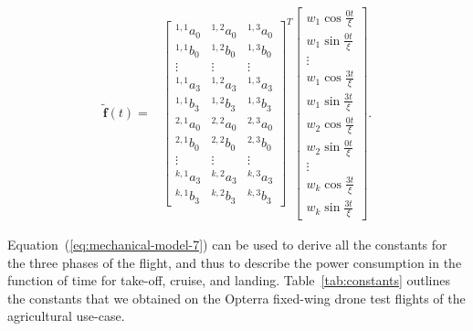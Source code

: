 \begin{equation}\label{eq:mechanical-model-7}
  \begin{split}
  \widetilde{\mathbf{f}}(t)=&
  \begin{bmatrix}
    {}^{1,1}a_0 & {}^{1,2}a_0 & {}^{1,3}a_0 \\
    {}^{1,1}b_0 & {}^{1,2}b_0 & {}^{1,3}b_0 \\
    \vdots & \vdots &\vdots \\
    {}^{1,1}a_3 & {}^{1,2}a_3 & {}^{1,3}a_3 \\
    {}^{1,1}b_3 & {}^{1,2}b_3 & {}^{1,3}b_3 \\
    {}^{2,1}a_0 & {}^{2,2}a_0 & {}^{2,3}a_0 \\
    {}^{2,1}b_0 & {}^{2,2}b_0 & {}^{2,3}b_0 \\
    \vdots & \vdots &\vdots \\
    {}^{k,1}a_3 & {}^{k,2}a_3 & {}^{k,3}a_3 \\
    {}^{k,1}b_3 & {}^{k,2}b_3 & {}^{k,3}b_3
  \end{bmatrix}^T
  \begin{bmatrix}
    w_1\cos\frac{0t}{\xi} \\ w_1\sin\frac{0t}{\xi} \\ \vdots \\ 
    w_1\cos\frac{3t}{\xi} \\  w_1\sin\frac{3t}{\xi} \\ 
    w_2\cos\frac{0t}{\xi} \\  w_2\sin\frac{0t}{\xi} \\ \vdots \\ 
    w_k\cos\frac{3t}{\xi} \\ w_k\sin\frac{3t}{\xi}
  \end{bmatrix}.
\end{split}
\end{equation}

Equation~(\ref{eq:mechanical-model-7}) can be used to derive all the constants for the three phases of the flight, and thus to describe the power consumption in the function of time for take-off, cruise, and landing. Table~\ref{tab:constants} outlines the constants that we obtained on the Opterra fixed-wing drone test flights of the agricultural use-case.

